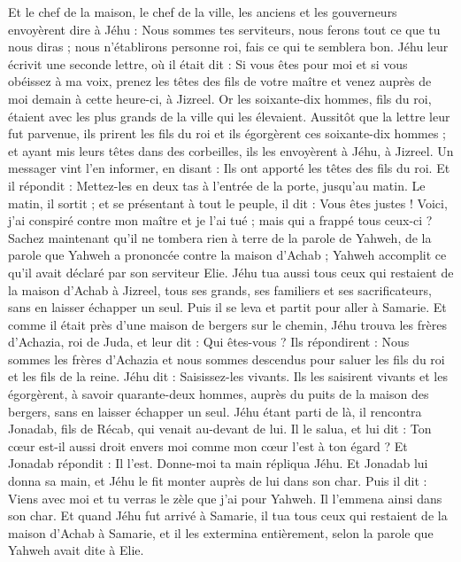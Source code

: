 \begin{multicols}{2}
Et le chef de la maison, le chef de la ville, les anciens et les gouverneurs envoyèrent dire à Jéhu : Nous sommes tes serviteurs, nous ferons tout ce que tu nous diras ; nous n'établirons personne roi, fais ce qui te semblera bon.
Jéhu leur écrivit une seconde lettre, où il était dit : Si vous êtes pour moi et si vous obéissez à ma voix, prenez les têtes des fils de votre maître et venez auprès de moi demain à cette heure-ci, à Jizreel. Or les soixante-dix hommes, fils du roi, étaient avec les plus grands de la ville qui les élevaient.
Aussitôt que la lettre leur fut parvenue, ils prirent les fils du roi et ils égorgèrent ces soixante-dix hommes ; et ayant mis leurs têtes dans des corbeilles, ils les envoyèrent à Jéhu, à Jizreel.
Un messager vint l'en informer, en disant : Ils ont apporté les têtes des fils du roi. Et il répondit : Mettez-les en deux tas à l'entrée de la porte, jusqu'au matin.
Le matin, il sortit ; et se présentant à tout le peuple, il dit : Vous êtes justes ! Voici, j'ai conspiré contre mon maître et je l'ai tué ; mais qui a frappé tous ceux-ci ?
Sachez maintenant qu'il ne tombera rien à terre de la parole de Yahweh, de la parole que Yahweh a prononcée contre la maison d'Achab ; Yahweh accomplit ce qu'il avait déclaré par son serviteur Elie.
Jéhu tua aussi tous ceux qui restaient de la maison d'Achab à Jizreel, tous ses grands, ses familiers et ses sacrificateurs, sans en laisser échapper un seul.
Puis il se leva et partit pour aller à Samarie. Et comme il était près d'une maison de bergers sur le chemin,
Jéhu trouva les frères d'Achazia, roi de Juda, et leur dit : Qui êtes-vous ? Ils répondirent : Nous sommes les frères d'Achazia et nous sommes descendus pour saluer les fils du roi et les fils de la reine.
Jéhu dit : Saisissez-les vivants. Ils les saisirent vivants et les égorgèrent, à savoir quarante-deux hommes, auprès du puits de la maison des bergers, sans en laisser échapper un seul.
Jéhu étant parti de là, il rencontra Jonadab, fils de Récab, qui venait au-devant de lui. Il le salua, et lui dit : Ton cœur est-il aussi droit envers moi comme mon cœur l'est à ton égard ? Et Jonadab répondit : Il l'est. Donne-moi ta main répliqua Jéhu. Et Jonadab lui donna sa main, et Jéhu le fit monter auprès de lui dans son char.
Puis il dit : Viens avec moi et tu verras le zèle que j'ai pour Yahweh. Il l'emmena ainsi dans son char.
Et quand Jéhu fut arrivé à Samarie, il tua tous ceux qui restaient de la maison d'Achab à Samarie, et il les extermina entièrement, selon la parole que Yahweh avait dite à Elie.

\end{multicols}
